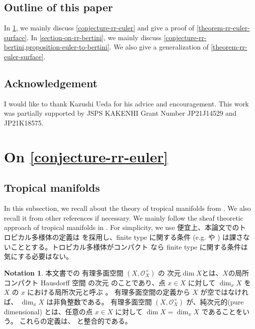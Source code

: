 \documentclass[a4paper,dvipdfmx,reqno,12pt]{amsart}
\theoremstyle{definition}
\newtheorem{notation}[theorem]{Notation}
\numberwithin{equation}{section}
\begin{document}
\subsection{Outline of this paper}
In \cref{section-on-rr-euler}, we mainly
discuss \cref{conjecture-rr-euler} and
give a proof of \cref{theorem-rr-euler-surface}.
In \cref{section-on-rr-bertini}, we mainly
discuss \cref{conjecture-rr-bertini,proposition-euler-to-bertini}.
We also give a generalization of
\cref{theorem-rr-euler-surface}.

\subsection*{Acknowledgement}
I would like to thank Kazushi Ueda for his advice
and encouragement. This work was partially supported 
by JSPS KAKENHI Grant Number JP21J14529 and JP21K18575.

\section{On \cref{conjecture-rr-euler}}
\label{section-on-rr-euler}
\subsection{Tropical manifolds}
In this subsection, we recall about 
the theory of tropical manifolds from
\cite{shaw2011tropical,MR3330789,mikhalkin2018tropical,MR4637248,demedrano2023chern}.
We also recall it from other references if necessary.
We mainly follow the sheaf theoretic approach of
tropical manifolds in \cite{MR4637248}.
For simplicity, we use 
便宜上、本論文でのトロピカル多様体の定義は
\cite[Definition 6.1]{gross2019sheaftheoretic}
を採用し、finite type に関する条件
(e.g. \cite[Definition 7.1.14]{mikhalkin2018tropical} や
\cite[Definition 2.3 (4)]{demedrano2023chern})
は課さないこととする。トロピカル多様体がコンパクト
なら finite type に関する条件は気にする必要はない。

\begin{notation}
本文書での
有理多面空間 $(X,\mathcal{O}_X^{\times})$ 
\cite[Definition 2.2]{MR4246795} の
次元$\dim X$とは、$X$の局所コンパクト Hausdorff 空間
の次元\cite[Chapter III. Definition 9.4]{MR842190}
のことであり、点 $x\in X$ に対して
$\dim_x X$ を $X$ の $x$ における局所次元と呼ぶ
\cite[Chapter III. Definition 9.10]{MR842190}。
有理多面空間の定義から $X$ が空ではなければ、
$\dim_x X$ は非負整数である。
有理多面空間
$(X,\mathcal{O}_X^{\times})$
が、純次元的(pure dimensional)
とは、任意の点 $x\in X$ に対して
$\dim X=\dim_x X$ であることをいう。
これらの定義は、
\cite[Definition 7.1.1]{mikhalkin2018tropical}
と整合的である。
\end{notation}
\end{document}
